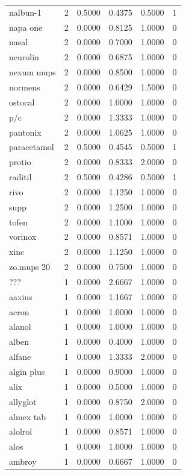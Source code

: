 \begin{longtable}{p{3.0cm}rrrrr}
nalbun-1 & 2 & 0.5000 & 0.4375 & 0.5000 & 1 \\
napa one & 2 & 0.0000 & 0.8125 & 1.0000 & 0 \\
nasal & 2 & 0.0000 & 0.7000 & 1.0000 & 0 \\
neurolin & 2 & 0.0000 & 0.6875 & 1.0000 & 0 \\
nexum mups & 2 & 0.0000 & 0.8500 & 1.0000 & 0 \\
normens & 2 & 0.0000 & 0.6429 & 1.5000 & 0 \\
ostocal & 2 & 0.0000 & 1.0000 & 1.0000 & 0 \\
p/c & 2 & 0.0000 & 1.3333 & 1.0000 & 0 \\
pantonix & 2 & 0.0000 & 1.0625 & 1.0000 & 0 \\
paracetamol & 2 & 0.5000 & 0.4545 & 0.5000 & 1 \\
protio & 2 & 0.0000 & 0.8333 & 2.0000 & 0 \\
raditil & 2 & 0.5000 & 0.4286 & 0.5000 & 1 \\
rivo & 2 & 0.0000 & 1.1250 & 1.0000 & 0 \\
supp & 2 & 0.0000 & 1.2500 & 1.0000 & 0 \\
tofen & 2 & 0.0000 & 1.1000 & 1.0000 & 0 \\
vorinox & 2 & 0.0000 & 0.8571 & 1.0000 & 0 \\
xinc & 2 & 0.0000 & 1.1250 & 1.0000 & 0 \\
zo.mups 20 & 2 & 0.0000 & 0.7500 & 1.0000 & 0 \\
??? & 1 & 0.0000 & 2.6667 & 1.0000 & 0 \\
aaxius & 1 & 0.0000 & 1.1667 & 1.0000 & 0 \\
acron & 1 & 0.0000 & 1.0000 & 1.0000 & 0 \\
alanol & 1 & 0.0000 & 1.0000 & 1.0000 & 0 \\
alben & 1 & 0.0000 & 0.4000 & 1.0000 & 0 \\
alfane & 1 & 0.0000 & 1.3333 & 2.0000 & 0 \\
algin plus & 1 & 0.0000 & 0.9000 & 1.0000 & 0 \\
alix & 1 & 0.0000 & 0.5000 & 1.0000 & 0 \\
allyglot & 1 & 0.0000 & 0.8750 & 2.0000 & 0 \\
almex tab & 1 & 0.0000 & 1.0000 & 1.0000 & 0 \\
alolrol & 1 & 0.0000 & 0.8571 & 1.0000 & 0 \\
alos & 1 & 0.0000 & 1.0000 & 1.0000 & 0 \\
ambroy & 1 & 0.0000 & 0.6667 & 1.0000 & 0 \\

\end{longtable}
